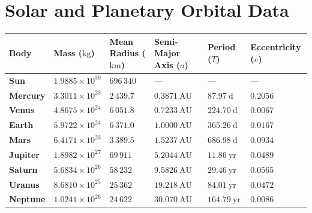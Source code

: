 \section{Solar and Planetary Orbital Data}

\begin{center}
\renewcommand{\arraystretch}{1.25}
\begin{longtable}{@{}llllll@{}}
\toprule
\textbf{Body} & \textbf{Mass ($\mathrm{kg}$)} & \textbf{Mean Radius ($\mathrm{km}$)} & \textbf{Semi-Major Axis ($a$)} & \textbf{Period ($T$)} & \textbf{Eccentricity ($e$)} \\
\midrule
\endhead
\textbf{Sun} & $1.9885 \times 10^{30}$ & $696\,340$ & --- & --- & --- \\
\textbf{Mercury} & $3.3011 \times 10^{23}$ & $2\,439.7$ & $0.3871\ \mathrm{AU}$ & $87.97\ \mathrm{d}$ & $0.2056$ \\
\textbf{Venus} & $4.8675 \times 10^{24}$ & $6\,051.8$ & $0.7233\ \mathrm{AU}$ & $224.70\ \mathrm{d}$ & $0.0067$ \\
\textbf{Earth} & $5.9722 \times 10^{24}$ & $6\,371.0$ & $1.0000\ \mathrm{AU}$ & $365.26\ \mathrm{d}$ & $0.0167$ \\
\textbf{Mars} & $6.4171 \times 10^{23}$ & $3\,389.5$ & $1.5237\ \mathrm{AU}$ & $686.98\ \mathrm{d}$ & $0.0934$ \\
\textbf{Jupiter} & $1.8982 \times 10^{27}$ & $69\,911$ & $5.2044\ \mathrm{AU}$ & $11.86\ \mathrm{yr}$ & $0.0489$ \\
\textbf{Saturn} & $5.6834 \times 10^{26}$ & $58\,232$ & $9.5826\ \mathrm{AU}$ & $29.46\ \mathrm{yr}$ & $0.0565$ \\
\textbf{Uranus} & $8.6810 \times 10^{25}$ & $25\,362$ & $19.218\ \mathrm{AU}$ & $84.01\ \mathrm{yr}$ & $0.0472$ \\
\textbf{Neptune} & $1.0241 \times 10^{26}$ & $24\,622$ & $30.070\ \mathrm{AU}$ & $164.79\ \mathrm{yr}$ & $0.0086$ \\
\bottomrule
\end{longtable}
\end{center}
